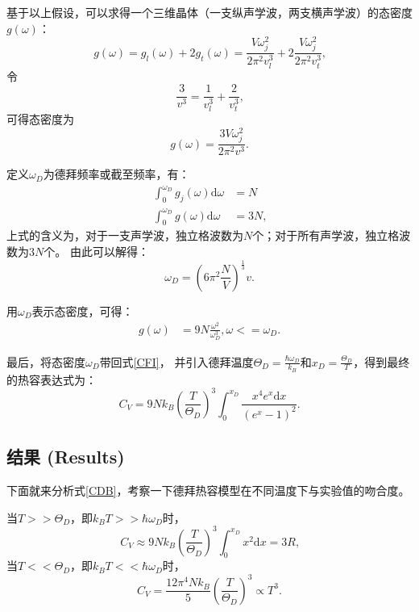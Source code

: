 \documentclass[declarePage]{ecnuthesis}
\begin{document}
基于以上假设，可以求得一个三维晶体（一支纵声学波，两支横声学波）的态密度$g(\omega)$：
\begin{equation}
    g(\omega) = g_l(\omega) + 2g_t(\omega) = \frac{V\omega_j^2}{2\pi^2v_l^3} + 2\frac{V\omega_j^2}{2\pi^2v_t^3} \text{,}
\end{equation}
令
\begin{equation}
    \frac{3}{v^3} = \frac{1}{v_l^3} + \frac{2}{v_t^3} \text{,}
\end{equation}
可得态密度为
\begin{equation}
    g(\omega) = \frac{3V\omega_j^2}{2\pi^2v^3} \text{.}
\end{equation}

定义$\omega_D$为德拜频率或截至频率，有：
\begin{align}
    \int_{0}^{\omega_D}g_j(\omega)\mathrm{d}\omega &= N\\
    \int_{0}^{\omega_D}  g(\omega)\mathrm{d}\omega &= 3N \text{,}
\end{align}
上式的含义为，对于一支声学波，独立格波数为$N$个；对于所有声学波，独立格波数为$3N$个。%
由此可以解得：
\begin{equation}
    \omega_D = \left( 6\pi^2\frac{N}{V} \right)^\frac{1}{3}v \text{.}
\end{equation}

用$\omega_D$表示态密度，可得：
\begin{align}
    g(\omega) &= 9N\frac{\omega^2}{\omega_D^3} \mathrm{,}\omega<=\omega_D \text{.}
\end{align}

最后，将态密度$\omega_D$带回式\ref{CFI}，%
并引入德拜温度$\Theta_D=\frac{\hbar\omega_D}{k_B}$和$x_D=\frac{\Theta_D}{T}$，得到最终的热容表达式为：
\begin{equation}
    C_V = 9Nk_B\left( \frac{T}{\Theta_D} \right)^3 \int_{0}^{x_D}\frac{x^4 e^x \mathrm{d}x}{(e^x-1)^2} \text{.} \label{CDB}
\end{equation}

\subsection{结果 (Results)}

下面就来分析式\ref{CDB}，考察一下德拜热容模型在不同温度下与实验值的吻合度。

当$T>>\Theta _D$，即$k_B T>>\hbar \omega_D$时，
\begin{equation}
    C_V \approx 9Nk_B\left( \frac{T}{\Theta_D} \right)^3 \int_{0}^{x_D}x^2 \mathrm{d}x = 3R \text{,}
\end{equation}
当$T<<\Theta _D$，即$k_B T<<\hbar \omega_D$时，
\begin{equation}
    C_V = \frac{12\pi^4Nk_B}{5}\left( \frac{T}{\Theta _D} \right)^3 \propto T^3 \text{.}
\end{equation}
\end{document}
